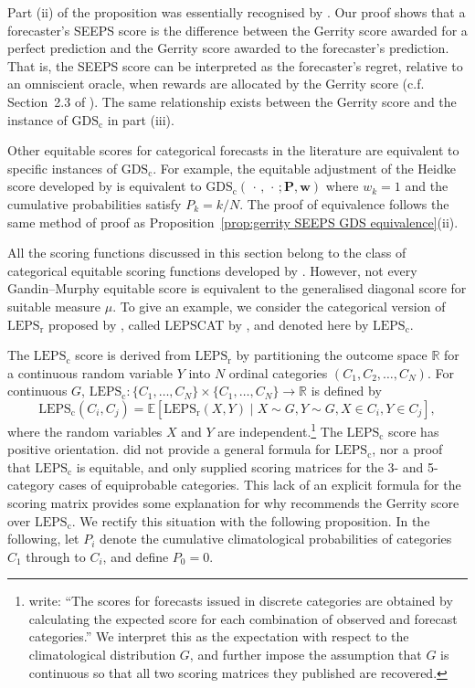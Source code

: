 \documentclass[10pt]{article} %
\theoremstyle{theorem}
\theoremstyle{definition}
\newcommand{\RRR}{\mathbb{R}}
\newcommand{\EEE}{\mathbb{E}}
\newcommand{\boldw}{\mathbf{w}}
\newcommand{\boldP}{\mathbf{P}}
\newcommand{\GDSc}{\mathrm{GDS}_\mathrm{c}}
\newcommand{\LEPSr}{\mathrm{LEPS}_\mathrm{r}}
\newcommand{\LEPSc}{\mathrm{LEPS}_\mathrm{c}}
\begin{document}
Part (ii) of the proposition was essentially recognised by \citet[Section~5.2.1]{rodwell2010new}. Our proof shows that a forecaster's SEEPS score is the difference between the Gerrity score awarded for a perfect prediction and the Gerrity score awarded to the forecaster's prediction. That is, the SEEPS score can be interpreted as the forecaster's regret, relative to an omniscient oracle, when rewards are allocated by the Gerrity score (c.f. Section~2.3 of \citealt{ehm2016quantiles}). The same relationship exists between the Gerrity score and the instance of $\GDSc$ in part (iii).

Other equitable scores for categorical forecasts in the literature are equivalent to specific instances of $\GDSc$. For example, the equitable adjustment of the Heidke score developed by \citet[Table~4]{barnston1992correspondence} is equivalent to $\GDSc(\,\cdot\,,\,\cdot\,; \boldP, \boldw)$ where $w_k=1$ and the cumulative probabilities satisfy $P_k=k/N$. The proof of equivalence follows the same method of proof as Proposition~\ref{prop:gerrity SEEPS GDS equivalence}(ii).

All the scoring functions discussed in this section belong to the class of categorical equitable scoring functions developed by \citet{gandin1992equitable}. However, not every Gandin--Murphy equitable score is equivalent to the generalised diagonal score for suitable measure $\mu$. To give an example, we consider the categorical version of $\LEPSr$ proposed by \citet{potts1996revised}, called LEPSCAT by \citet{Livezey2003Categorical}, and denoted here by $\LEPSc$.

The $\LEPSc$ score is derived from $\LEPSr$ by partitioning the outcome space $\RRR$ for a continuous random variable $Y$ into $N$ ordinal categories $(C_1,C_2,\ldots,C_N)$. For continuous $G$,  $\LEPSc:\{C_1,\ldots,C_N\}\times\{C_1,\ldots,C_N\}\to\RRR$ is defined by
\begin{equation}\label{eq:LEPSCAT}
\LEPSc(C_i,C_j) = \EEE[\LEPSr(X,Y) \mid X\sim G, Y\sim G, X\in C_i, Y\in C_j],
\end{equation}
where the random variables $X$ and $Y$ are independent.\footnote{\citet{potts1996revised} write: ``The scores for forecasts issued in discrete categories are obtained by calculating the expected score for each combination of observed and forecast categories.'' We interpret this as the expectation with respect to the climatological distribution $G$, and further impose the assumption that $G$ is continuous so that all two scoring matrices they published are recovered.} The $\LEPSc$ score has positive orientation. \citet{potts1996revised} did not provide a general formula for $\LEPSc$, nor a proof that $\LEPSc$ is equitable, and only supplied scoring matrices for the 3- and 5-category cases of equiprobable categories. This lack of an explicit formula for the scoring matrix provides some explanation for why \citet{Livezey2003Categorical} recommends the Gerrity score over $\LEPSc$. We rectify this situation with the following proposition. In the following, let $P_i$ denote the cumulative climatological probabilities of categories $C_1$ through to $C_i$, and define $P_0=0$.
\end{document}
